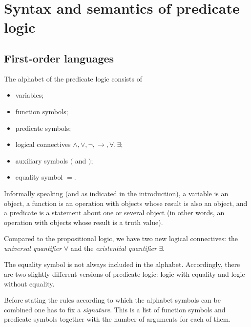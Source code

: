 \begin{page}
\setcounter{section}{1}
\setcounter{subsection}{1}
\setcounter{dfn}{0}
\label{portion:554}

\section{Syntax and semantics of predicate logic}

\end{page}

\begin{page}
\setcounter{section}{1}
\setcounter{subsection}{1}
\setcounter{dfn}{0}
\label{portion:556}

\subsection{First-order languages}
The alphabet of the predicate logic consists of
\begin{itemize}
\item
variables;
\item
function symbols;
\item
predicate symbols;
\item
logical connectives $\wedge, \vee, \neg, \to, \forall, \exists$;
\item
auxiliary symbols $($ and $)$;
\item
equality symbol $=$.
\end{itemize}

Informally speaking (and as indicated in the introduction), a variable is an object,
a function is an operation with objects whose result is also an object,
and a predicate is a statement about one or several object (in other words, an operation with objects whose result is a truth value).

Compared to the propositional logic, we have two new logical connectives:
the \emph{universal quantifier} $\forall$ and the \emph{existential quantifier} $\exists$.

The equality symbol is not always included in the alphabet.
Accordingly, there are two slightly different versions of predicate logic: logic with equality and logic without equality.

Before stating the rules according to which the alphabet symbols can be combined one has to fix a \emph{signature}.
This is a list of function symbols and predicate symbols together with the number of arguments for each of them.


\end{page}

